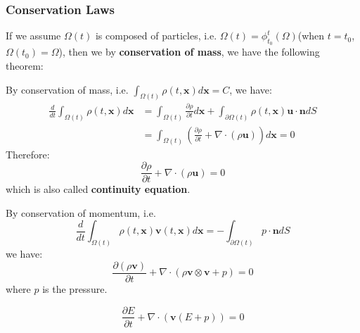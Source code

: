 \subsubsection{Conservation Laws}
If we assume $\Omega(t)$ is composed of particles, i.e. $\Omega(t)=\phi_{t_0}^t(\Omega)$(when $t = t_0$, $\Omega(t_0)=\Omega$), 
then we by \textbf{conservation of mass}, we have the following theorem:
\begin{theorem}
    By conservation of mass, i.e. $\int_{\Omega(t)} \rho(t, \mathbf{x}) d\mathbf{x} = C$, we have:
    \begin{equation}
        \begin{aligned}
            \frac{d}{dt}\int_{\Omega(t)} \rho(t, \mathbf{x}) d\mathbf{x} &= \int_{\Omega(t)} \frac{\partial \rho}{\partial t} d\mathbf{x} + \int_{\partial \Omega(t)} \rho(t, \mathbf{x}) \mathbf{u} \cdot \mathbf{n} d S\\ 
            &= \int_{\Omega(t)} \left(\frac{\partial \rho}{\partial t}  + \nabla\cdot \left(\rho\mathbf{u}\right)\right) d\mathbf{x}=0
        \end{aligned}
    \end{equation}
    Therefore:
    \begin{equation}
        \frac{\partial \rho}{\partial t}  + \nabla\cdot \left(\rho\mathbf{u}\right) = 0
    \end{equation}
    which is also called \textbf{continuity equation}.
\end{theorem}
\begin{theorem}
    By conservation of momentum, i.e. 
    \begin{equation}
        \frac{d}{dt}\int_{\Omega(t)} \rho(t, \mathbf{x})\mathbf{v}(t, \mathbf{x}) d\mathbf{x} = -\int_{\partial \Omega(t)} p\cdot \mathbf{n} d S
    \end{equation}
    we have:
    \begin{equation}
        \frac{\partial (\rho \mathbf{v})}{\partial t} + \nabla\cdot \left(\rho \mathbf{v} \otimes \mathbf{v} + p\right) = 0
    \end{equation}
    where $p$ is the pressure.
\end{theorem}
\begin{theorem}
    \begin{equation}
        \frac{\partial E}{\partial t} + \nabla\cdot \left(\mathbf{v}(E + p)\right) = 0
    \end{equation}
\end{theorem}
